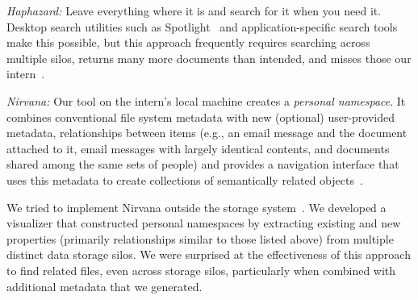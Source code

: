 
\textit{Haphazard:} Leave everything where it is and search for it when you need it.
Desktop search utilities such as Spotlight~\cite{apple-search} and application-specific search tools make this possible,
but this approach frequently requires searching across multiple silos, returns many more documents than intended, and misses those our intern~\cite{bergman2019factors}.

\textit{Nirvana:} Our tool on the intern's local machine creates a \textit{personal namespace}.
It combines conventional file system metadata with new (optional) user-provided metadata, relationships between items (e.g., an email
message and the document attached to it, email messages with largely identical contents, and documents shared among the same sets of people)
and provides a navigation interface that uses this metadata to create collections of semantically related objects~\cite{gifford1991semantic}.

We tried to implement Nirvana outside the storage system~\cite{ashish}.
We developed a visualizer that constructed personal namespaces by extracting existing and new properties (primarily relationships similar to those listed above) from multiple distinct data storage silos.
We were surprised at the effectiveness of this approach to find related files, even across storage silos, particularly when combined with additional metadata that we generated.


